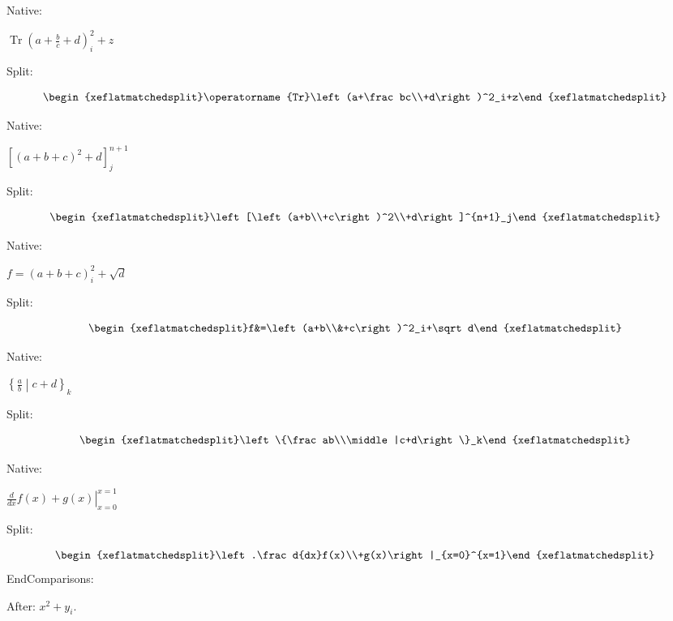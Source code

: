 \documentclass{article}
\newcommand\XeCompare[2]{\par\bigskip\noindent Native:\par\noindent
 $\displaystyle#1$\par\medskip\noindent Split:\par
 \[\begin{xeflatmatchedsplit}#2\end{xeflatmatchedsplit}\]}
\begin{document}
\XeCompare{\operatorname{Tr}\left(a+\frac bc+d\right)^2_i+z}
 {\operatorname{Tr}\left(a+\frac bc\\+d\right)^2_i+z}
\XeCompare{\left[\left(a+b+c\right)^2+d\right]^{n+1}_j}
 {\left[\left(a+b\\+c\right)^2\\+d\right]^{n+1}_j}
\XeCompare{f=\left(a+b+c\right)^2_i+\sqrt d}
 {f&=\left(a+b\\&+c\right)^2_i+\sqrt d}
\XeCompare{\left\{\frac ab\middle|c+d\right\}_k}
 {\left\{\frac ab\\\middle|c+d\right\}_k}
\XeCompare{\left.\frac d{dx}f(x)+g(x)\right|_{x=0}^{x=1}}
 {\left.\frac d{dx}f(x)\\+g(x)\right|_{x=0}^{x=1}}
\noindent EndComparisons:\par
After: $x^2+y_i$.
\end{document}
